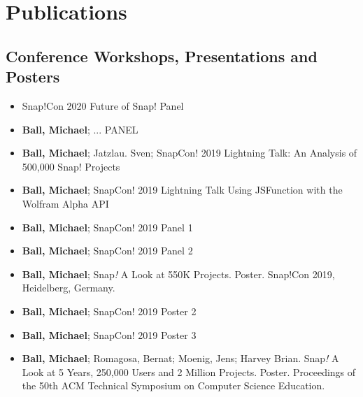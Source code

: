 \section{Publications}
\vspace{6pt}

\subsection{Conference Workshops, Presentations and Posters}

\vspace{5pt}

\begin{itemize}

  \setlength\itemsep{1em}
    \item{Snap!Con 2020 Future of Snap! Panel}
    
    \item{\textbf{Ball, Michael}; ... PANEL}

    
    \item{\textbf{Ball, Michael}; Jatzlau. Sven;  SnapCon! 2019 Lightning Talk: An Analysis of 500,000 Snap! Projects}
    
    \item{\textbf{Ball, Michael};  SnapCon! 2019 Lightning Talk Using JSFunction with the Wolfram Alpha API}
    
    \item{\textbf{Ball, Michael}; SnapCon! 2019 Panel 1}
    
    \item{\textbf{Ball, Michael}; SnapCon! 2019 Panel 2}
    
    \item{\textbf{Ball, Michael}; Snap\textit{!} A Look at 550K Projects. Poster. Snap!Con 2019, Heidelberg, Germany.}
    
    \item{\textbf{Ball, Michael}; SnapCon! 2019 Poster 2}
    
    \item{\textbf{Ball, Michael}; SnapCon! 2019 Poster 3}
    
    \item{\textbf{Ball, Michael}; Romagosa, Bernat; Moenig, Jens; Harvey Brian. Snap\textit{!} A Look at 5 Years, 250,000 Users and 2 Million Projects. Poster. Proceedings of the 50th ACM Technical Symposium on Computer Science Education.}
    

\end{itemize}

